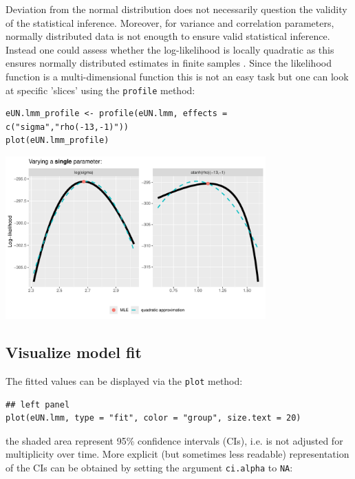 \documentclass[12pt]{article}
\newcommand\Warning[1][3ex]{%
\renewcommand\stacktype{L}%
\scaleto{\stackon[1.3pt]{\color{red}$\triangle$}{\tiny\bfseries !}}{#1}%
\xspace
}
\begin{document}
\Warning Deviation from the normal distribution does not necessarily
question the validity of the statistical inference. Moreover, for
variance and correlation parameters, normally distributed data is not
enougth to ensure valid statistical inference. Instead one could
assess whether the log-likelihood is locally quadratic as this ensures
normally distributed estimates in finite samples
\citep{geyer2013asymptotics}. Since the likelihood function is a
multi-dimensional function this is not an easy task but one can look
at specific 'slices' using the \texttt{profile} method:

\lstset{language=r,label= ,caption= ,captionpos=b,numbers=none}
\begin{lstlisting}
eUN.lmm_profile <- profile(eUN.lmm, effects = c("sigma","rho(-13,-1)"))
plot(eUN.lmm_profile)
\end{lstlisting}


\begin{center}
\includegraphics[width=0.75\textwidth]{./figures/diag-profileUN.pdf}
\end{center}

\clearpage

\subsection{Visualize model fit}
\label{sec:orge876d91}

The fitted values can be displayed via the \texttt{plot} method:
\lstset{language=r,label= ,caption= ,captionpos=b,numbers=none}
\begin{lstlisting}
## left panel
plot(eUN.lmm, type = "fit", color = "group", size.text = 20)
\end{lstlisting}

\Warning the shaded area represent 95\% confidence intervals (CIs),
  i.e. is not adjusted for multiplicity over time. More explicit (but
  sometimes less readable) representation of the CIs can be obtained
  by setting the argument \texttt{ci.alpha} to \texttt{NA}:
\end{document}
